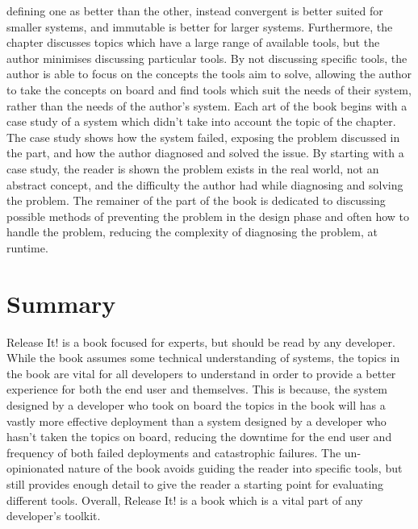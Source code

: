\documentclass[11pt]{article}
\begin{document}
defining one as better than the other, instead convergent is better suited for smaller systems,
and immutable is better for larger systems.
Furthermore, the chapter discusses topics which have a large range of available tools, but the 
author minimises discussing particular tools.
By not discussing specific tools, the author is able to focus on the concepts the tools aim to 
solve, allowing the author to take the concepts on board and find tools which suit the needs of
their system, rather than the needs of the author's system.
Each art of the book begins with a case study of a system which didn't take into account the
topic of the chapter.
The case study shows how the system failed, exposing the problem discussed in the part, and how
the author diagnosed and solved the issue.
By starting with a case study, the reader is shown the problem exists in the real world, not an
abstract concept, and the difficulty the author had while diagnosing and solving the problem.
The remainer of the part of the book is dedicated to discussing possible methods of preventing the
problem in the design phase and often how to handle the problem, reducing the complexity of 
diagnosing the problem, at runtime.

\section{Summary}
Release It! is a book focused for experts, but should be read by any developer.
While the book assumes some technical understanding of systems, the topics in the book are vital
for all developers to understand in order to provide a better experience for both the end user and
themselves.
This is because, the system designed by a developer who took on board the topics in the book will
has a vastly more effective deployment than a system designed by a developer who hasn't taken the 
topics on board, reducing the downtime for the end user and frequency of both failed deployments
and catastrophic failures.
The un-opinionated nature of the book avoids guiding the reader into specific tools, but still 
provides enough detail to give the reader a starting point for evaluating different tools.
Overall, Release It! is a book which is a vital part of any developer's toolkit.



\end{document}
